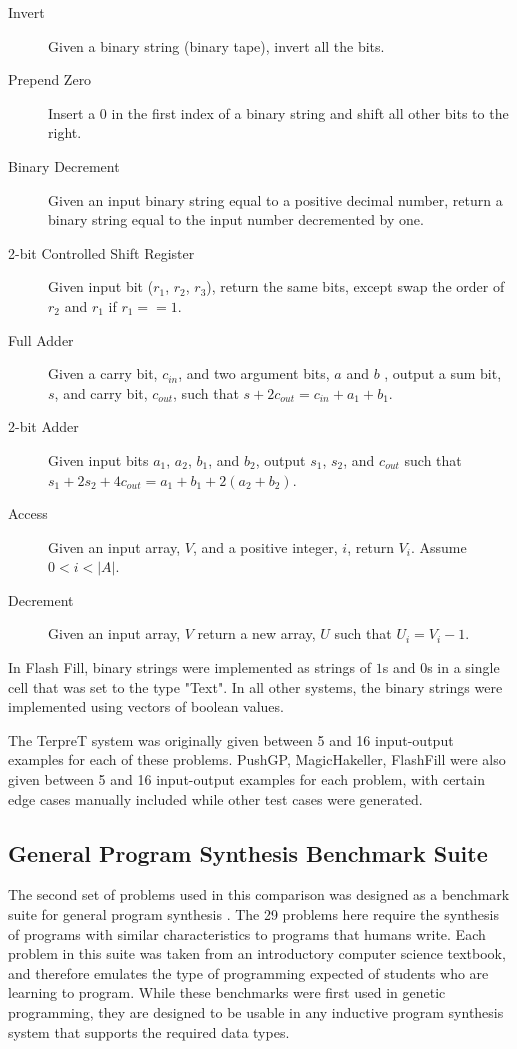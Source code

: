 \begin{description}

\item[Invert] Given a binary string (binary tape), invert all the bits. 

\item[Prepend Zero] Insert a $0$ in the first index of a binary string and shift all other bits to the right.

\item[Binary Decrement] Given an input binary string equal to a positive decimal number, return a binary string equal to the input number decremented by one.

\item[2-bit Controlled Shift Register] Given input bit ($r_1$, $r_2$, $r_3$), return the same bits, except swap the order of $r_2$ and $r_1$ if $r_1 == 1$.

\item[Full Adder] Given a carry bit, $c_{in}$, and two argument bits, $a$ and $b$ , output a sum bit, $s$, and carry bit, $c_{out}$, such that  $s + 2c_{out} = c_{in} + a_1 + b_1$.

\item[2-bit Adder] Given input bits $a_1$, $a_2$, $b_1$, and $b_2$, output $s_1$, $s_2$, and $c_{out}$ such that  $s_1 + 2s_2 + 4c_{out} = a_1 + b_1 + 2(a_2 + b_2)$.

\item[Access] Given an input array, $V$, and a positive integer, $i$, return $V_i$. Assume $0 < i < |A|$.

\item[Decrement] Given an input array, $V$ return a new array, $U$ such that $U_i = V_i - 1$.

\end{description}

In Flash Fill, binary strings were implemented as strings of $1$s and $0$s in a single cell that was set to the type "Text". In all other systems, the binary strings were implemented using vectors of boolean values.

The TerpreT system was originally given between 5 and 16 input-output examples for each of these problems. PushGP, MagicHakeller, FlashFill were also given between 5 and 16 input-output examples for each problem, with certain edge cases manually included while other test cases were generated.


\subsection{General Program Synthesis Benchmark Suite}
The second set of problems used in this comparison was designed as a benchmark suite for general program synthesis \cite{Helmuth2015b}. The 29 problems here require the synthesis of programs with similar characteristics to programs that humans write. Each problem in this suite was taken from an introductory computer science textbook, and therefore emulates the type of programming expected of students who are learning to program. While these benchmarks were first used in genetic programming, they are designed to be usable in any inductive program synthesis system that supports the required data types.

